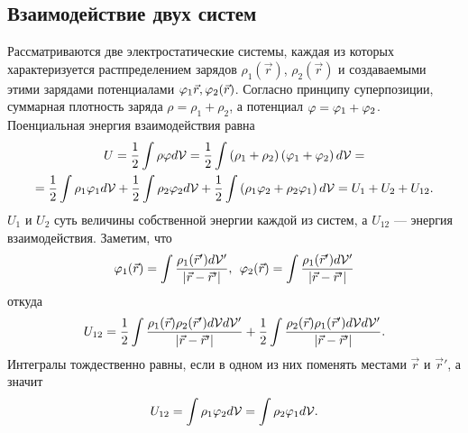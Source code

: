 \subsection{Взаимодействие двух систем}
    Рассматриваются две электростатические системы, каждая из которых характеризуется растпределением зарядов $\rho_1(\vec{r})$, $\rho_2(\vec{r})$
    и создаваемыми этими зарядами потенциалами $\varphi_1{\vec{r}}, \varphi_2(\vec{r})$. Согласно принципу суперпозиции, суммарная плотность заряда
    $\rho = \rho_1 + \rho_2$, а потенциал $\varphi = \varphi_1 + \varphi_2$. Поенциальная энергия взаимодействия равна
    \begin{gather*}
        U = \frac 12 \int\rho\varphi d\mathcal{V} = \frac 12 \int \left({\rho_1 + \rho_2}\right)\left({\varphi_1 + \varphi_2}\right)d\mathcal{V} = \\
        = \frac 12 \int \rho_1 \varphi_1 d\mathcal{V} + \frac 12 \int \rho_2 \varphi_2 d\mathcal{V} + \frac 12 \int \left({\rho_1 \varphi_2 + \rho_2 \varphi_1}\right) d\mathcal{V} =
        U_1 + U_2 + U_{12}.
    \end{gather*}
    $U_1$ и $U_2$ суть величины собственной энергии каждой из систем, а $U_{12}$ --- энергия взаимодействия. Заметим, что
    \[
        \varphi_1(\vec{r}) = \int\frac{\rho_1(\vec{r}')d\mathcal{V}'}{\left|{\vec{r} - \vec{r}'}\right|}, \:\:
        \varphi_2(\vec{r}) = \int\frac{\rho_1(\vec{r}')d\mathcal{V}'}{\left|{\vec{r} - \vec{r}'}\right|}
    \]
    откуда
    \[
        U_{12} = \frac 12 \int\frac{\rho_1(\vec{r})\rho_2({\vec{r}'})d\mathcal{V} d\mathcal{V}'}{\left|{\vec{r} - \vec{r}'}\right|} + 
        \frac 12 \int\frac{\rho_2(\vec{r})\rho_1({\vec{r}'})d\mathcal{V} d\mathcal{V}'}{\left|{\vec{r} - \vec{r}'}\right|}.
    \]
    Интегралы тождественно равны, если в одном из них поменять местами $\vec{r}$ и $\vec{r}'$, а значит
    \[
        U_{12} = \int\rho_1\varphi_2 d\mathcal{V} = \int \rho_2\varphi_1d\mathcal{V}.
    \]

    \begin{figure}[h]
    \end{figure}

